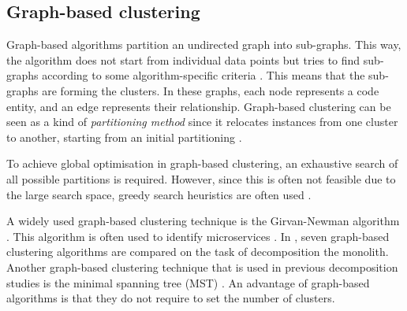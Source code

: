 \subsection{Graph-based clustering}
Graph-based algorithms partition an undirected graph into sub-graphs. This way, the algorithm does not start from individual data points but tries to find sub-graphs according to some algorithm-specific criteria \cite{wiggerts1997using}. This means that the sub-graphs are forming the clusters. In these graphs, each node represents a code entity, and an edge represents their relationship. Graph-based clustering can be seen as a kind of \textit{partitioning method} since it relocates instances from one cluster to another, starting from an initial partitioning \cite{rokach2005clustering}. \par
To achieve global optimisation in graph-based clustering, an exhaustive search of all possible partitions is required. However, since this is often not feasible due to the large search space, greedy search heuristics are often used \cite{rokach2005clustering}. \par 
A widely used graph-based clustering technique is the Girvan-Newman algorithm \cite{girvan2002community}. This algorithm is often used to identify microservices \cite{gysel2016service, matias2020determining}. In \cite{lohnertz2020steinmetz}, seven graph-based clustering algorithms are compared on the task of decomposition the monolith. Another graph-based clustering technique that is used in previous decomposition studies is the minimal spanning tree (MST) \cite{mazlami2017extraction}. 
An advantage of graph-based algorithms is that they do not require to set the number of clusters.

